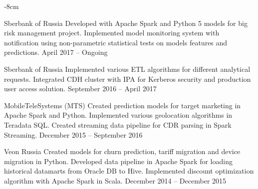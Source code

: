\documentclass[10pt,a4paper]{altacv}
\begin{document}


\begin{adjustwidth}{}{-8cm}
\makecvheader
\end{adjustwidth}


    {Sberbank of Russia}
    {
        Developed with Apache Spark and Python 5 models for big risk management project.\linebreak
        Implemented model monitoring system with notification using non-parametric statistical tests on models features and predictions. 
    }
    {April 2017 -- Ongoing}
{}

\divider

    {Sberbank of Russia}
    {
        Implemented various ETL algorithms for different analytical requests. \linebreak
        Integrated CDH cluster with IPA for Kerberos security and production user access solution.
    }
    {September 2016 -- April 2017}
{}

\divider

    {MobileTeleSystems (MTS)}
    {
        Created prediction models for target marketing in Apache Spark and Python. \linebreak
        Implemented various geolocation algorithms in Teradata SQL. \linebreak
        Created streaming data pipeline for CDR parsing in Spark Streaming. \linebreak
    }
    {December 2015 -- September 2016}
{}

\divider

    {Veon Russia}
    {
        Created models for churn prediction, tariff migration and device migration in Python. \linebreak
        Developed data pipeline in Apache Spark for loading historical datamarts from Oracle DB to Hive. \linebreak
        Implemented discount optimization algorithm with Apache Spark in Scala.
    }
    {December 2014 -- December 2015}
{}
\end{document}
